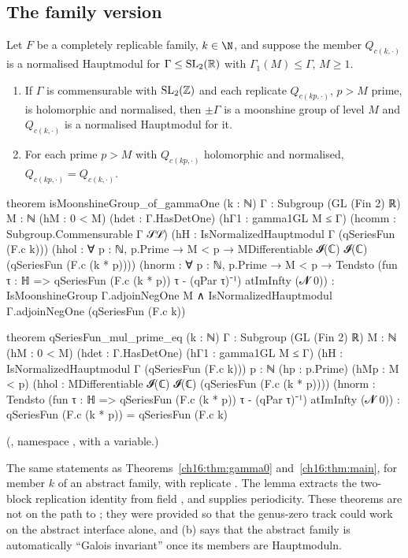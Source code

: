 \subsection{The family version}

\begin{theorem}\label{ch16:thm:family}
Let $F$ be a completely replicable family, $k\in\N$, and suppose the member $Q_{c(k,\cdot)}$ is a normalised Hauptmodul
for $\Gamma\le\mathrm{SL}_2(\mathbb{R})$ with $\Gamma_1(M)\le\Gamma$, $M\ge1$.
\begin{enumerate}[label=(\alph*)]
\item If $\Gamma$ is commensurable with $\mathrm{SL}_2(\mathbb{Z})$ and each replicate $Q_{c(kp,\cdot)}$, $p>M$ prime, is holomorphic
  and normalised, then $\pm\Gamma$ is a moonshine group of level $M$ and $Q_{c(k,\cdot)}$ is a normalised Hauptmodul for
  it.
\item For each prime $p>M$ with $Q_{c(kp,\cdot)}$ holomorphic and normalised, $Q_{c(kp,\cdot)}=Q_{c(k,\cdot)}$.
\end{enumerate}
\end{theorem}
\begin{leancode}
theorem isMoonshineGroup_of_gammaOne (k : ℕ) {Γ : Subgroup (GL (Fin 2) ℝ)} {M : ℕ}
    (hM : 0 < M) (hdet : Γ.HasDetOne) (hΓ1 : gamma1GL M ≤ Γ)
    (hcomm : Subgroup.Commensurable Γ 𝒮ℒ) (hH : IsNormalizedHauptmodul Γ (qSeriesFun (F.c k)))
    (hhol : ∀ p : ℕ, p.Prime → M < p → MDifferentiable 𝓘(ℂ) 𝓘(ℂ) (qSeriesFun (F.c (k * p))))
    (hnorm : ∀ p : ℕ, p.Prime → M < p →
      Tendsto (fun τ : ℍ => qSeriesFun (F.c (k * p)) τ - (qPar τ)⁻¹) atImInfty (𝓝 0)) :
    IsMoonshineGroup Γ.adjoinNegOne M ∧
      IsNormalizedHauptmodul Γ.adjoinNegOne (qSeriesFun (F.c k))

theorem qSeriesFun_mul_prime_eq (k : ℕ) {Γ : Subgroup (GL (Fin 2) ℝ)} {M : ℕ}
    (hM : 0 < M) (hdet : Γ.HasDetOne) (hΓ1 : gamma1GL M ≤ Γ)
    (hH : IsNormalizedHauptmodul Γ (qSeriesFun (F.c k))) {p : ℕ} (hp : p.Prime) (hMp : M < p)
    (hhol : MDifferentiable 𝓘(ℂ) 𝓘(ℂ) (qSeriesFun (F.c (k * p))))
    (hnorm : Tendsto (fun τ : ℍ => qSeriesFun (F.c (k * p)) τ - (qPar τ)⁻¹) atImInfty (𝓝 0)) :
    qSeriesFun (F.c (k * p)) = qSeriesFun (F.c k)
\end{leancode}
(, namespace ,
with  a variable.)
\begin{dictionary}
The same statements as Theorems~\ref{ch16:thm:gamma0} and~\ref{ch16:thm:main}, for member $k$ of an abstract family, with
replicate .  The lemma  extracts the two-block
replication identity from field , and  supplies periodicity.  These
theorems are not on the path to ; they were provided so that the genus-zero track could work on the
abstract interface alone, and (b) says that the abstract family is automatically ``Galois invariant'' once its members
are Hauptmoduln.
\end{dictionary}
